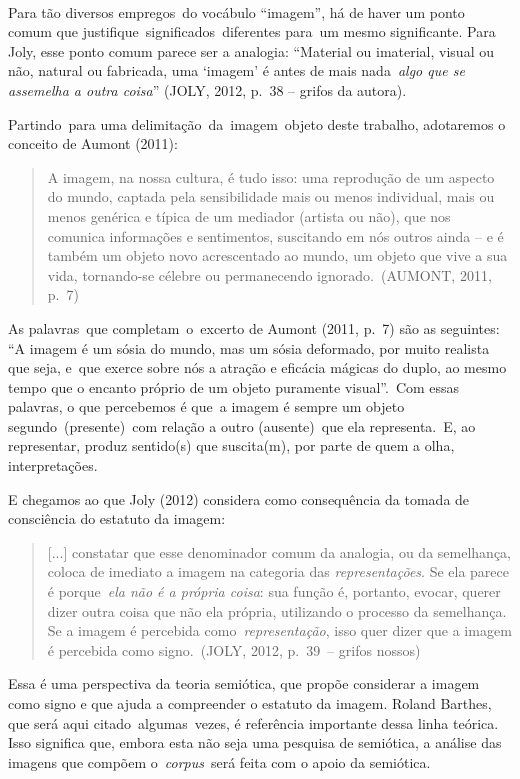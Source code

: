 \documentclass[
  letterpaper,
]{abntex2}
\begin{document}
~

Para tão diversos empregos~do vocábulo ``imagem'', há de haver um ponto
comum que justifique~significados~diferentes para~um mesmo significante.
Para Joly, esse ponto comum parece ser a analogia: ``Material ou
imaterial, visual ou não, natural ou fabricada, uma `imagem' é antes de
mais nada~\emph{algo que se assemelha a outra coisa}'' (JOLY, 2012,
p.~38 -- grifos da autora).~

Partindo~para uma delimitação~da~imagem~objeto deste trabalho,
adotaremos o conceito de Aumont (2011):~ ~

\begin{quote}
A imagem, na nossa cultura, é tudo isso: uma reprodução de um aspecto do
mundo, captada pela sensibilidade mais ou menos individual, mais ou
menos genérica e típica de um mediador (artista ou não), que nos
comunica informações e sentimentos, suscitando em nós outros ainda -- e
é também um objeto novo acrescentado ao mundo, um objeto que vive a sua
vida, tornando-se célebre ou permanecendo ignorado.~(AUMONT, 2011,
p.~7)~ ~
\end{quote}

As palavras~que completam~o~excerto de Aumont (2011, p.~7) são as
seguintes: ``A imagem é um sósia do mundo, mas um sósia deformado, por
muito realista que seja, e~que exerce sobre nós a atração e eficácia
mágicas do duplo, ao mesmo tempo que o encanto próprio de um objeto
puramente visual''.~Com essas palavras, o que percebemos é que~a imagem
é sempre um objeto segundo~(presente)~com relação a outro (ausente)~que
ela representa.~E, ao representar, produz sentido(s) que suscita(m), por
parte de quem a olha, interpretações.~

E chegamos ao que Joly (2012) considera como consequência da tomada de
consciência do estatuto da imagem: ~

\begin{quote}
{[}...{]} constatar que esse denominador comum da analogia, ou da
semelhança, coloca de imediato a imagem na categoria das
\emph{representações}. Se ela parece é porque~\emph{ela não é a própria
coisa}: sua função é, portanto, evocar, querer dizer outra coisa que não
ela própria, utilizando o processo da semelhança. Se a imagem é
percebida como~\emph{representação}, isso quer dizer que a imagem é
percebida como signo.~(JOLY, 2012, p.~39~-- grifos nossos)~ ~
\end{quote}

Essa é uma perspectiva da teoria semiótica, que propõe considerar a
imagem como signo e que ajuda a compreender o estatuto da imagem. Roland
Barthes, que será aqui citado~algumas~vezes, é referência importante
dessa linha teórica. Isso significa que, embora esta não seja uma
pesquisa de semiótica, a análise das imagens que compõem
o~\emph{corpus}~será feita com o apoio da semiótica.~
\end{document}
